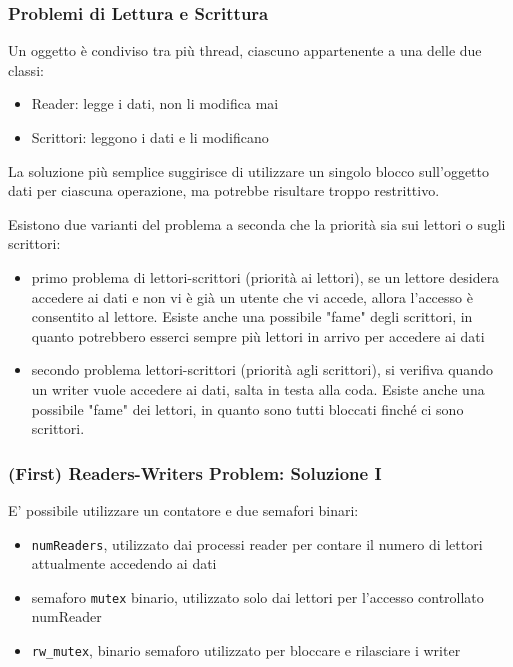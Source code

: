 \documentclass{article}
\begin{document}
\pagebreak
\subsubsection{Problemi di Lettura e Scrittura}
Un oggetto è condiviso tra più thread, ciascuno appartenente a una delle due classi: 
\begin{itemize}
    \item Reader: legge i dati, non li modifica mai
    \item Scrittori: leggono i dati e li modificano
\end{itemize}

La soluzione più semplice suggirisce di utilizzare un singolo blocco sull'oggetto dati per ciascuna operazione, ma potrebbe risultare troppo restrittivo.\par
Esistono due varianti del problema a seconda che la priorità sia sui lettori o sugli scrittori:
\begin{itemize}
    \item primo problema di lettori-scrittori (priorità ai lettori), se un lettore desidera accedere ai dati e non vi è già un utente che vi accede, allora l'accesso è consentito al lettore. Esiste anche una possibile "fame" degli scrittori, in quanto potrebbero esserci sempre più lettori in arrivo per accedere ai dati
    \item secondo problema lettori-scrittori (priorità agli scrittori), si verifiva quando un writer vuole accedere ai dati, salta in testa alla coda. Esiste anche una possibile "fame" dei lettori, in quanto sono tutti bloccati finché ci sono scrittori.
\end{itemize}
\subsubsection{(First) Readers-Writers Problem: Soluzione I}
E' possibile utilizzare un contatore e due semafori binari:
\begin{itemize}
    \item \texttt{numReaders}, utilizzato dai processi reader per contare il numero di lettori
    attualmente accedendo ai dati
    \item semaforo \texttt{mutex} binario, utilizzato solo dai lettori per l'accesso controllato
    numReader
    \item \texttt{rw\_mutex}, binario semaforo utilizzato per bloccare e rilasciare i writer
\end{itemize}
\end{document}
